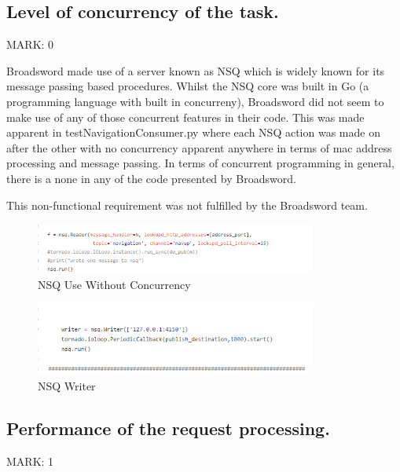 \documentclass{article}
\begin{document}
\subsection{Level of concurrency of the task.}
\begin{flushleft}
MARK: 0
\end{flushleft}

\begin{flushleft}
Broadsword made use of a server known as NSQ which is widely known for its message passing based procedures. Whilst the NSQ core was built in Go (a programming language with built in concurreny), Broadsword did not seem to make use of any of those concurrent features in their code. This was made apparent in testNavigationConsumer.py where each NSQ action was made on after the other with no concurrency apparent anywhere in terms of mac address processing and message passing. In terms of concurrent programming in general, there is a none in any of the code presented by Broadsword. 
\end{flushleft}

\begin{flushleft}
This non-functional requirement was not fulfilled by the Broadsword team.
\end{flushleft}

\begin{figure}[ht]
  \includegraphics[width=350px]{Images/concurrency.PNG}
  \caption{NSQ Use Without Concurrency}
  \label{NSQ Use Without Concurrency}
\end{figure}

\begin{figure}[ht]
  \includegraphics[width=350px]{Images/concurrency2.PNG}
  \caption{NSQ Writer}
  \label{NSQ Writer}
\end{figure}

\subsection{Performance of the request processing.}
\begin{flushleft}
MARK: 1
\end{flushleft}
\end{document}
